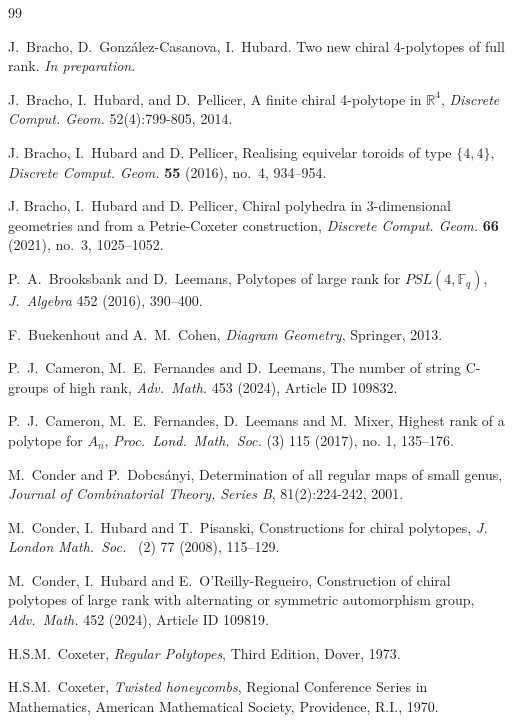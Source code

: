 \documentclass[12pt]{article}
\renewcommand{\>}{\rangle}
\theoremstyle{definition}\newtheorem{definition}{Definition}[section]
\begin{document}
\begin{thebibliography}{99}

J.~Bracho, D.~Gonz\'alez-Casanova, I.~Hubard. Two new chiral 4-polytopes of full rank. \textit{In preparation}.

 J.~Bracho, I.~Hubard, and D.~Pellicer, A finite chiral 4-polytope in $\mathbb{R}^4$, \textit{Discrete Comput. Geom.} 52(4):799-805, 2014.

 J. Bracho, I.~Hubard and D. Pellicer, Realising equivelar toroids of type $\{4,4\}$, \textit{Discrete Comput. Geom.} {\bf 55} (2016), no.~4, 934--954.

J. Bracho, I.~Hubard and D. Pellicer, Chiral polyhedra in 3-dimensional geometries and from a Petrie-Coxeter construction, \textit{Discrete Comput. Geom.} {\bf 66} (2021), no.~3, 1025--1052.

 P.~A.~Brooksbank and D.~Leemans, Polytopes of large rank for $PSL(4,\mathbb{F}_q)$, \textit{J.\ Algebra} 452 (2016), 390--400.

 F.~Buekenhout and A.~M.~Cohen, \textit{Diagram Geometry}, Springer, 2013.

 P.~J.~Cameron, M.~E.~Fernandes and D.~Leemans, The number of string C-groups of high rank, \textit{Adv.\ Math.} 453 (2024), Article ID 109832.

 P.~J.~Cameron, M.~E.~Fernandes, D.~Leemans and M.~Mixer, Highest rank of a polytope for $A_n$, \textit{Proc.\ Lond.\ Math.\ Soc.} (3) 115 (2017), no. 1, 135--176.

M.~Conder and P.~Dobcsányi, Determination of all regular maps of small genus, \textit{Journal of Combinatorial Theory, Series B}, 81(2):224-242, 2001.

 M.~Conder, I.~Hubard and T.~Pisanski, Constructions for chiral polytopes, {\em J. London Math.\ Soc.\/} \ (2) 77 (2008), 115--129.

 M.~Conder, I.~Hubard and E.~O’Reilly-Regueiro, Construction of chiral polytopes of large rank with alternating or symmetric automorphism group,  \textit{Adv.\ Math.} 452 (2024), Article ID 109819.

H.S.M.~Coxeter, \textit{Regular Polytopes}, Third Edition, Dover, 1973. 

H.S.M.~Coxeter, {\em Twisted honeycombs}, Regional Conference Series in Mathematics, American Mathematical Society, Providence, R.I., 1970.


\end{thebibliography}
\end{document}
